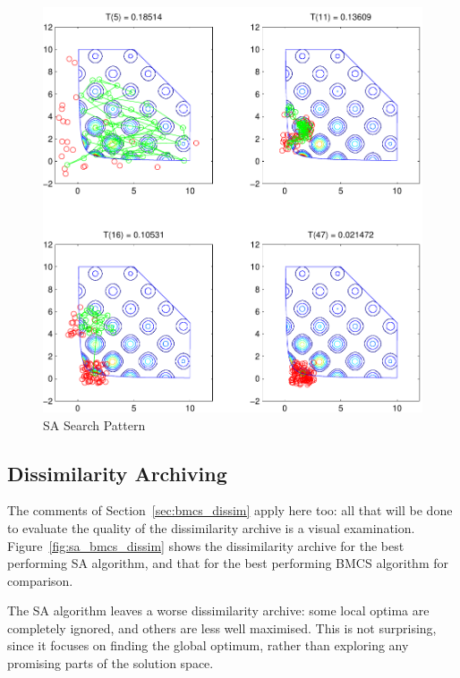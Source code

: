 \documentclass[10pt]{article}
\begin{document}
\begin{figure}[htbp]
  \begin{center}
    \includegraphics[width=12cm]{sa_search_pattern.pdf}
    \end{center}
    \caption{SA Search Pattern}
    \label{fig:sa_search_pattern}
    \end{figure}

\subsection{Dissimilarity Archiving}

The comments of Section~\ref{sec:bmcs_dissim} apply here too: all that will be
done to evaluate the quality of the dissimilarity archive is a visual
examination. Figure~\ref{fig:sa_bmcs_dissim} shows the dissimilarity archive
for the best performing SA algorithm, and that for the best performing BMCS
algorithm for comparison.

The SA algorithm leaves a worse dissimilarity archive: some local optima are
completely ignored, and others are less well maximised. This is not
surprising, since it focuses on finding the global optimum, rather than
exploring any promising parts of the solution space.
\end{document}
